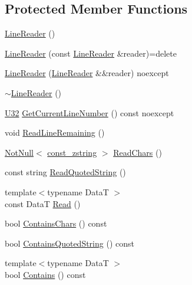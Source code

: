 \subsection*{Protected Member Functions}
\begin{DoxyCompactItemize}
\item 
\hyperlink{classmage_1_1_line_reader_ab4a46321d7ea3ecda2d6390c78a7285b}{Line\+Reader} ()
\item 
\hyperlink{classmage_1_1_line_reader_ae4f871bebae110704b34c0bd88460639}{Line\+Reader} (const \hyperlink{classmage_1_1_line_reader}{Line\+Reader} \&reader)=delete
\item 
\hyperlink{classmage_1_1_line_reader_ae90c546a98e113a48ca1c94b854a4866}{Line\+Reader} (\hyperlink{classmage_1_1_line_reader}{Line\+Reader} \&\&reader) noexcept
\item 
\hyperlink{classmage_1_1_line_reader_ad9753ea392ebe5b3867852d3392fb1e7}{$\sim$\+Line\+Reader} ()
\item 
\hyperlink{namespacemage_a41c104c036fba3756a74e19f793eeaa1}{U32} \hyperlink{classmage_1_1_line_reader_aa0ed768e2799b74f2341c56fc6ac4969}{Get\+Current\+Line\+Number} () const noexcept
\item 
void \hyperlink{classmage_1_1_line_reader_a3a4b99bfef1e8a826d74a01bcc663fcb}{Read\+Line\+Remaining} ()
\item 
\hyperlink{namespacemage_a8769f9d670d6b585ea306cb1062af94b}{Not\+Null}$<$ \hyperlink{namespacemage_abfd9206dc607ceb5d13ec68bf075a5c0}{const\+\_\+zstring} $>$ \hyperlink{classmage_1_1_line_reader_afcb163cbc75ad1650437d809bbbc2d9b}{Read\+Chars} ()
\item 
const string \hyperlink{classmage_1_1_line_reader_ae9a7547d01b29c3237b198444d4f3aef}{Read\+Quoted\+String} ()
\item 
{\footnotesize template$<$typename DataT $>$ }\\const DataT \hyperlink{classmage_1_1_line_reader_aa1ba5aa332e49bdd63ef4ee4021120fd}{Read} ()
\item 
bool \hyperlink{classmage_1_1_line_reader_a0369e06fa3b38ecb22ffd5892759225f}{Contains\+Chars} () const
\item 
bool \hyperlink{classmage_1_1_line_reader_a99b4fa47fc341ad4fda112ea9505efcb}{Contains\+Quoted\+String} () const
\item 
{\footnotesize template$<$typename DataT $>$ }\\bool \hyperlink{classmage_1_1_line_reader_a3401db2b0ecd15d8048a1b321eceb77a}{Contains} () const
\end{DoxyCompactItemize}
